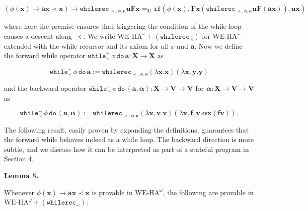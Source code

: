 \par  \quad  \[(\phi(\bm{x})\to\bm{a}\bm{x}\prec\bm{x})\to\mathtt{whilerec}_{\prec,\phi,\bm{a}}\bm{u}\bm{F}\bm{x}=_{\bm{U}}\mathtt{if}({\phi(\bm{x})},{\bm{F}\bm{x}\left(\mathtt{whilerec}_{\prec,\phi,\bm{a}}\bm{u}\bm{F}(\bm{a}\bm{x})\right)},{\bm{u}\bm{x}})\]\quad  \quad  
  
where here the premise ensures that triggering the condition of the while loop causes a descent along $\prec$. We write $\mathrm{WE}\mbox{-}\mathrm{HA}^{\omega}+(\mathtt{whilerec}_{\prec})$ for $\mathrm{WE}\mbox{-}\mathrm{HA}^{\omega}$ extended with the while recursor and its axiom for all $\phi$ and $\bm{a}$. Now we define the forward while operator $\mathtt{while}^{+}_{\prec}\,{\phi}\,\mathtt{do}\,{\bm{a}}:\bm{X}\to\bm{X}$ as\par
  
\par  \quad  \[\mathtt{while}^{+}_{\prec}\,{\phi}\,\mathtt{do}\,{\bm{a}}:=\mathtt{whilerec}_{\prec,\phi,\bm{a}}(\lambda\bm{x}.\bm{x})(\lambda\bm{x},\bm{y}.\bm{y})\]\quad  \quad  
  
and the backward operator $\mathtt{while}^{-}_{\prec}\,{\phi}\,\mathtt{do}\,{(\bm{a},\bm{\alpha})}:\bm{X}\to\bm{V}\to\bm{V}$ for $\bm{\alpha}:\bm{X}\to\bm{V}\to\bm{V}$ as\par
  
\par  \quad  \[\mathtt{while}^{-}_{\prec}\,{\phi}\,\mathtt{do}\,{(\bm{a},\bm{\alpha})}:=\mathtt{whilerec}_{\prec,\phi,\bm{a}}(\lambda\bm{x},\bm{v}.\bm{v})(\lambda\bm{x},\bm{f},\bm{v}.\bm{\alpha}\bm{x}(\bm{f}\bm{v})).\]\quad  \quad  
  
The following result, easily proven by expanding the definitions, guarantees that the forward while behaves indeed as a while loop. The backward direction is more subtle, and we discuss how it can be interpreted as part of a stateful program in Section 4.\par
 
 
 
\par\medskip\noindent\textbf{Lemma 5.}\par
 
 
Whenever $\phi(\bm{x})\to\bm{a}\bm{x}\prec\bm{x}$ is provable in $\mathrm{WE}\mbox{-}\mathrm{HA}^{\omega}$, the following are provable in $\mathrm{WE}\mbox{-}\mathrm{HA}^{\omega}+(\mathtt{whilerec}_{\prec})$:\par
  
